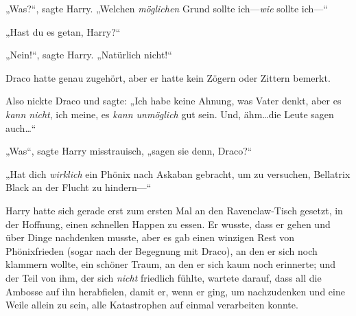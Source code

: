 „Was?“, sagte Harry. „Welchen \emph{möglichen} Grund sollte ich—\emph{wie} sollte ich—“

„Hast du es getan, Harry?“

„Nein!“, sagte Harry. „Natürlich nicht!“

Draco hatte genau zugehört, aber er hatte kein Zögern oder Zittern bemerkt.

Also nickte Draco und sagte: „Ich habe keine Ahnung, was Vater denkt, aber es \emph{kann nicht}, ich meine, es \emph{kann unmöglich} gut sein. Und, ähm…die Leute sagen auch…“

„Was“, sagte Harry misstrauisch, „sagen sie denn, Draco?“

„Hat dich \emph{wirklich} ein Phönix nach Askaban gebracht, um zu versuchen, Bellatrix Black an der Flucht zu hindern—“


Harry hatte sich gerade erst zum ersten Mal an den Ravenclaw-Tisch gesetzt, in der Hoffnung, einen schnellen Happen zu essen. Er wusste, dass er gehen und über Dinge nachdenken musste, aber es gab einen winzigen Rest von Phönixfrieden (sogar nach der Begegnung mit Draco), an den er sich noch klammern wollte, ein schöner Traum, an den er sich kaum noch erinnerte; und der Teil von ihm, der sich \emph{nicht} friedlich fühlte, wartete darauf, dass all die Ambosse auf ihn herabfielen, damit er, wenn er ging, um nachzudenken und eine Weile allein zu sein, alle Katastrophen auf einmal verarbeiten konnte.

